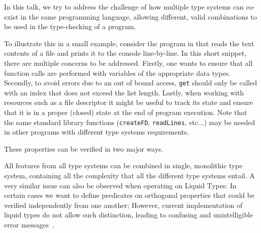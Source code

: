 \documentclass{easychair}
\begin{document}
In this talk, we try to address the challenge of how multiple type systems can co-exist in the same programming language, allowing different, valid combinations to be used in the type-checking of a program.
 
 
 To illustrate this in a small example, consider the program in  that reads the text contents of a file and prints it to the console line-by-line. In this short snippet, there are multiple concerns to be addressed. Firstly, one wants to ensure that all function calls are performed with variables of the appropriate data types. Secondly, to avoid errors due to an out of bound access, \texttt{get} should only be called with an index that does not exceed the list length. Lastly, when working with resources such as a file descriptor it might be useful to track its state and ensure that it is in a proper (closed) state at the end of program execution. Note that the same standard library functions (\lstinline|createFD|, \lstinline|readLines|, etc...) may be needed in other programs with different type systems requirements.
 


These properties can be verified in two major ways. 

All features from all type systems can be combined in single, monolithic type system, containing all the complexity that all the different type systems entail. A very similar issue can also be observed when operating on Liquid Types: In certain cases we want to define predicates on orthogonal properties that could be verified independently from one another; However, current implementation of liquid types do not allow such distinction, leading to confusing and unintelligible error messages~\cite{wits-error-messages}. 
\end{document}
